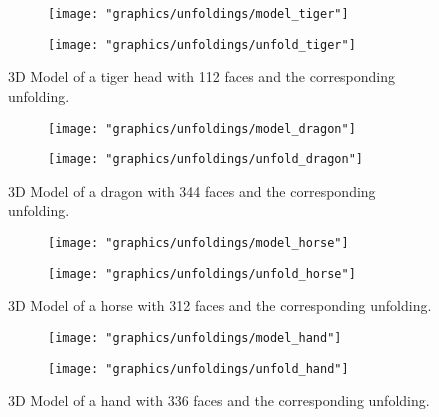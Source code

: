 \documentclass[draft,final]{vutinfth} %
\begin{document}
\begin{figure}
  \begin{subfigure}[b]{0.475\textwidth}
    \texttt{[image: "graphics/unfoldings/model\_tiger"]}
  \end{subfigure}
  \begin{subfigure}[b]{0.475\textwidth}
    \texttt{[image: "graphics/unfoldings/unfold\_tiger"]}
  \end{subfigure}
  
  \caption{3D Model of a tiger head with 112 faces and the corresponding unfolding.}
  \label{fig:tiger}
\end{figure}

\begin{figure}
  \begin{subfigure}[b]{0.475\textwidth}
    \texttt{[image: "graphics/unfoldings/model\_dragon"]}
  \end{subfigure}
  \begin{subfigure}[b]{0.475\textwidth}
    \texttt{[image: "graphics/unfoldings/unfold\_dragon"]}
  \end{subfigure}
  
  \caption{3D Model of a dragon with 344 faces and the corresponding unfolding.}
  \label{fig:dragon}
\end{figure}

\begin{figure}
  \begin{subfigure}[b]{0.475\textwidth}
    \texttt{[image: "graphics/unfoldings/model\_horse"]}
  \end{subfigure}
  \begin{subfigure}[b]{0.475\textwidth}
    \texttt{[image: "graphics/unfoldings/unfold\_horse"]}
  \end{subfigure}
  
  \caption{3D Model of a horse with 312 faces and the corresponding unfolding.}
  \label{fig:horse}
\end{figure}

\begin{figure}
  \begin{subfigure}[b]{0.475\textwidth}
    \texttt{[image: "graphics/unfoldings/model\_hand"]}
  \end{subfigure}
  \begin{subfigure}[b]{0.475\textwidth}
    \texttt{[image: "graphics/unfoldings/unfold\_hand"]}
  \end{subfigure}
  
  \caption{3D Model of a hand with 336 faces and the corresponding unfolding.}
  \label{fig:hand}
\end{figure}
\end{document}
